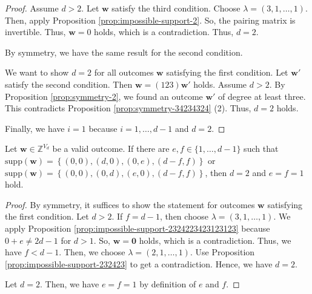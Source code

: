 \begin{proof}


    Assume \( d > 2 \). Let \( \mathbf{w} \) satisfy the third condition. Choose \( \lambda = (3,1, \dots, 1) \). Then, apply Proposition \ref{prop:impossible-support-2}. So, the pairing matrix is invertible. Thus, \( \mathbf{w} = 0 \) holds, which is a contradiction. Thus, \( d = 2 \).
    
    By symmetry, we have the same result for the second condition.

    We want to show \( d=2 \) for all outcomes \( \mathbf{w} \) satisfying the first condition. Let \( \mathbf{w}' \) satisfy the second condition. Then \( \mathbf{w} = (123) \mathbf{w}' \) holds. Assume \( d > 2 \). By Proposition \ref{prop:symmetry-2}, we found an outcome \( \mathbf{w}' \) of degree at least three. This contradicts Proposition \ref{prop:symmetry-34234324} (2). Thus, \( d = 2 \) holds.

    Finally, we have \( i = 1 \) because \( i = 1, \dots, d-1 \) and \( d = 2 \).
\end{proof}

\begin{proposition}\label{prop:symmetry-232lkmlksm}
    Let \( \mathbf{w} \in \mathbb{Z}^{V_d} \) be a valid outcome. If there are \( e,f \in \{1 , \dots, d-1\} \) such that \( \mathrm{supp}(\mathbf{w}) = \left\{ (0,0), (d,0), (0,e), (d-f,f) \right\} \)  or  \( \mathrm{supp}(\mathbf{w}) = \left\{ (0,0), (0,d), (e,0), (d-f,f) \right\} \), then \( d = 2 \) and \( e = f = 1 \) hold.
\end{proposition}

\begin{proof}
    By symmetry, it suffices to show the statement for outcomes \( \mathbf{w} \) satisfying the first condition. Let \( d > 2 \). If \( f = d-1 \), then choose \( \lambda = (3,1,\dots,1) \). We apply Proposition \ref{prop:impossible-support-2324223423123123} because \( 0 + e \neq 2d - 1 \) for \( d > 1 \). So, \( \mathbf{w} = \mathbf 0\) holds, which is a contradiction. Thus, we have \( f < d-1 \). Then, we choose \( \lambda = (2, 1, \dots, 1) \). Use Proposition \ref{prop:impossible-support-232423} to get a contradiction. Hence, we have \( d = 2 \).

    Let \( d = 2 \). Then, we have \( e = f = 1 \) by definition of \( e \) and \( f \).
\end{proof}

